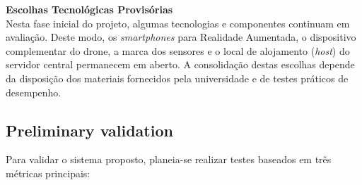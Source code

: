 \documentclass[conference,a4paper]{IEEEtran}
\begin{document}
\textbf{Escolhas Tecnológicas Provisórias} \\
Nesta fase inicial do projeto, algumas tecnologias e componentes continuam em avaliação. Deste modo, os \textit{smartphones} para Realidade Aumentada, o dispositivo complementar do drone, a marca dos sensores e o local de alojamento (\textit{host}) do servidor central permanecem em aberto. A consolidação destas escolhas depende da disposição dos materiais fornecidos pela universidade e de testes práticos de desempenho.

\subsection{Preliminary validation}
Para validar o sistema proposto, planeia-se realizar testes baseados em três métricas principais:
\end{document}
